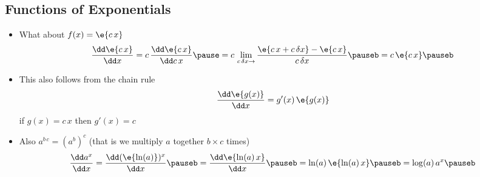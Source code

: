 
\begin{slide}
\section[-1]{Functions of Exponentials}

\begin{PauseHighLight}
  \begin{itemize}
  \item What about $f(x)= \e{c\,x}$
    \begin{align*}
      \frac{\dd \e{c\,x}}{\dd x} = c\, \frac{\dd \e{c\,x}}{\dd c\,x} \pause=
      c\, \lim_{c\,\delta x\rightarrow} \frac{\e{c\,x + c\,\delta x} -
      \e{c\,x}}{c\,\delta x} \pauseb =  c \, \e{c\,x}\pauseb
    \end{align*}
  \item This also follows from the chain rule
    \begin{align*}
       \frac{\dd \e{g(x)}}{\dd x} = g'(x)\,\e{g(x)}
    \end{align*}
    if $g(x)= c\,x$ then $g'(x)=c$\pauseb
  \item Also $a^{b\,c} = (a^b)^c$ (that is we multiply $a$
    together $b\times c$ times)\pauseb
    \begin{align*}
      \frac{\dd a^x}{\dd x} = \frac{\dd (\e{\ln(a)})^x }{\dd x}\pauseb =
      \frac{\dd \e{\ln(a)\, x}}{\dd x}\pauseb = \ln(a)\,  \e{\ln(a)\, x}\pauseb =
      \log(a)\, a^x\pauseb
    \end{align*}
  \end{itemize}
\end{PauseHighLight}

\end{slide}


